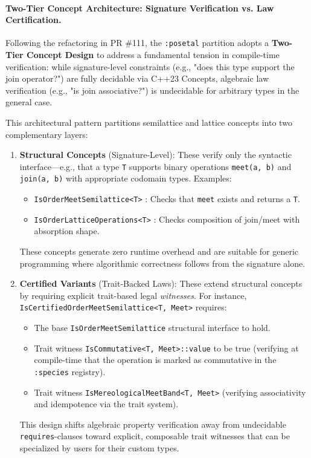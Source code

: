 \documentclass[11pt, a4paper]{report}
\begin{document}
\paragraph{Two-Tier Concept Architecture: Signature Verification vs. Law Certification.}

Following the refactoring in PR \#111, the \texttt{:posetal} partition adopts a \textbf{Two-Tier Concept Design} to address a fundamental tension in compile-time verification: while signature-level constraints (e.g., "does this type support the join operator?") are fully decidable via C++23 Concepts, algebraic law verification (e.g., "is join associative?") is undecidable for arbitrary types in the general case. 

This architectural pattern partitions semilattice and lattice concepts into two complementary layers:

\begin{enumerate}
\item \textbf{Structural Concepts} (Signature-Level): These verify only the syntactic interface---e.g., that a type \texttt{T} supports binary operations \texttt{meet(a, b)} and \texttt{join(a, b)} with appropriate codomain types. Examples:
  \begin{itemize}
    \item \texttt{IsOrderMeetSemilattice<T>} : Checks that \texttt{meet} exists and returns a \texttt{T}.
    \item \texttt{IsOrderLatticeOperations<T>} : Checks composition of join/meet with absorption shape.
  \end{itemize}
  
  These concepts generate zero runtime overhead and are suitable for generic programming where algorithmic correctness follows from the signature alone.

\item \textbf{Certified Variants} (Trait-Backed Laws): These extend structural concepts by requiring explicit trait-based legal \emph{witnesses}. For instance, \texttt{IsCertifiedOrderMeetSemilattice<T, Meet>} requires:
  \begin{itemize}
    \item The base \texttt{IsOrderMeetSemilattice} structural interface to hold.
    \item Trait witness \texttt{IsCommutative<T, Meet>::value} to be true (verifying at compile-time that the operation is marked as commutative in the \texttt{:species} registry).
    \item Trait witness \texttt{IsMereologicalMeetBand<T, Meet>} (verifying associativity and idempotence via the trait system).
  \end{itemize}

  This design shifts algebraic property verification away from undecidable \texttt{requires}-clauses toward explicit, composable trait witnesses that can be specialized by users for their custom types.
\end{enumerate}
\end{document}
